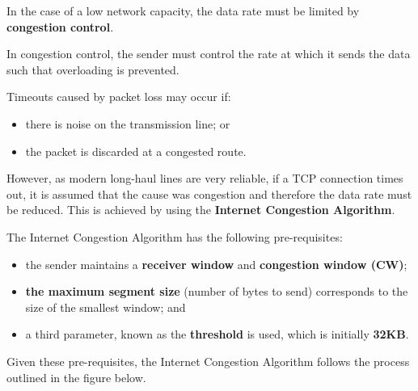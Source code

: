 \documentclass[a4paper]{systems-software}
\begin{document}
In the case of a low network capacity, the data rate must be limited by \textbf{congestion control}.

In congestion control, the sender must control the rate at which it sends the data such that overloading is prevented.

Timeouts caused by packet loss may occur if:
\begin{itemize}
	\item there is noise on the transmission line; or
	\item the packet is discarded at a congested route.
\end{itemize}

However, as modern long-haul lines are very reliable, if a TCP connection times out, it is assumed that the cause was congestion and therefore the data rate must be reduced. This is achieved by using the \textbf{Internet Congestion Algorithm}.

The Internet Congestion Algorithm has the following pre-requisites:
\begin{itemize}
	\item the sender maintains a \textbf{receiver window} and \textbf{congestion window (CW)};
	\item \textbf{the maximum segment size} (number of bytes to send) corresponds to the size of the smallest window; and
	\item a third parameter, known as the \textbf{threshold} is used, which is initially \textbf{32KB}.
\end{itemize}

Given these pre-requisites, the Internet Congestion Algorithm follows the process outlined in the figure below.
\end{document}
